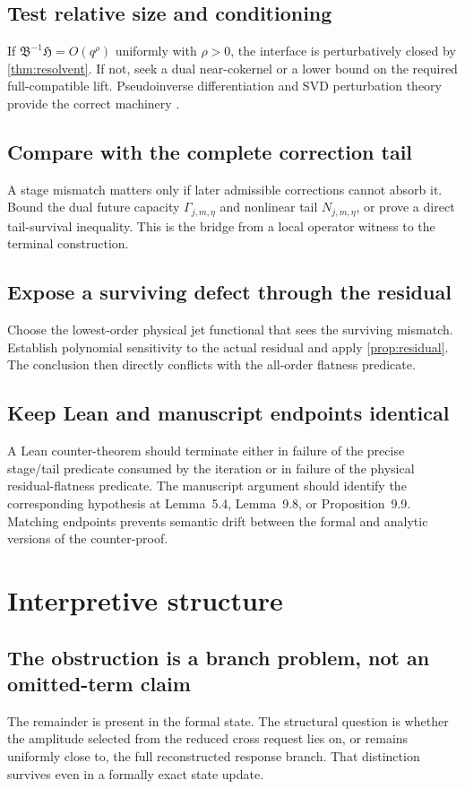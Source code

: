 \documentclass[12pt]{article}
\theoremstyle{plain}
\theoremstyle{definition}
\theoremstyle{remark}
\newcommand{\Red}{\mathfrak B}
\newcommand{\Hidden}{\mathfrak H}
\begin{document}
\subsection{Test relative size and conditioning}
If \(\Red^{-1}\Hidden=O(q^\rho)\) uniformly with \(\rho>0\), the interface is perturbatively closed by \cref{thm:resolvent}. If not, seek a dual near-cokernel or a lower bound on the required full-compatible lift. Pseudoinverse differentiation and SVD perturbation theory provide the correct machinery \cite{GolubPereyra1973,Wedin1972}.

\subsection{Compare with the complete correction tail}
A stage mismatch matters only if later admissible corrections cannot absorb it. Bound the dual future capacity \(\Gamma_{j,m,\eta}\) and nonlinear tail \(N_{j,m,\eta}\), or prove a direct tail-survival inequality. This is the bridge from a local operator witness to the terminal construction.

\subsection{Expose a surviving defect through the residual}
Choose the lowest-order physical jet functional that sees the surviving mismatch. Establish polynomial sensitivity to the actual residual and apply \cref{prop:residual}. The conclusion then directly conflicts with the all-order flatness predicate.

\subsection{Keep Lean and manuscript endpoints identical}
A Lean counter-theorem should terminate either in failure of the precise stage/tail predicate consumed by the iteration or in failure of the physical residual-flatness predicate. The manuscript argument should identify the corresponding hypothesis at Lemma~5.4, Lemma~9.8, or Proposition~9.9. Matching endpoints prevents semantic drift between the formal and analytic versions of the counter-proof.

\section{Interpretive structure}\label{sec:interpretation}
\subsection{The obstruction is a branch problem, not an omitted-term claim}
The remainder is present in the formal state. The structural question is whether the amplitude selected from the reduced cross request lies on, or remains uniformly close to, the full reconstructed response branch. That distinction survives even in a formally exact state update.
\end{document}
